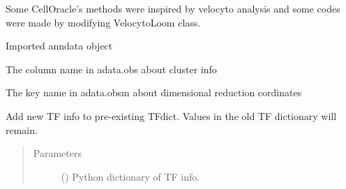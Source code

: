 \documentclass[letterpaper,10pt,english]{sphinxmanual}
\begin{document}
\begin{fulllineitems}
Some CellOracle’s methods were inspired by velocyto analysis and some codes were made by modifying VelocytoLoom class.

\begin{fulllineitems}
\label{\detokenize{modules/celloracle:celloracle.Oracle.adata}}
 \textendash{} Imported anndata object

\end{fulllineitems}


\begin{fulllineitems}
\label{\detokenize{modules/celloracle:celloracle.Oracle.cluster_column_name}}
 \textendash{} The column name in adata.obs about cluster info

\end{fulllineitems}


\begin{fulllineitems}
\label{\detokenize{modules/celloracle:celloracle.Oracle.embedding_name}}
 \textendash{} The key name in adata.obsm about dimensional reduction cordinates

\end{fulllineitems}


\begin{fulllineitems}
\label{\detokenize{modules/celloracle:celloracle.Oracle.addTFinfo_dictionary}}
Add new TF info to pre-existing TFdict.
Values in the old TF dictionary will remain.
\begin{quote}\begin{description}
\item[{Parameters}] \leavevmode
{} () \textendash{} Python dictionary of TF info.

\end{description}\end{quote}


\end{fulllineitems}
\end{fulllineitems}
\end{document}
